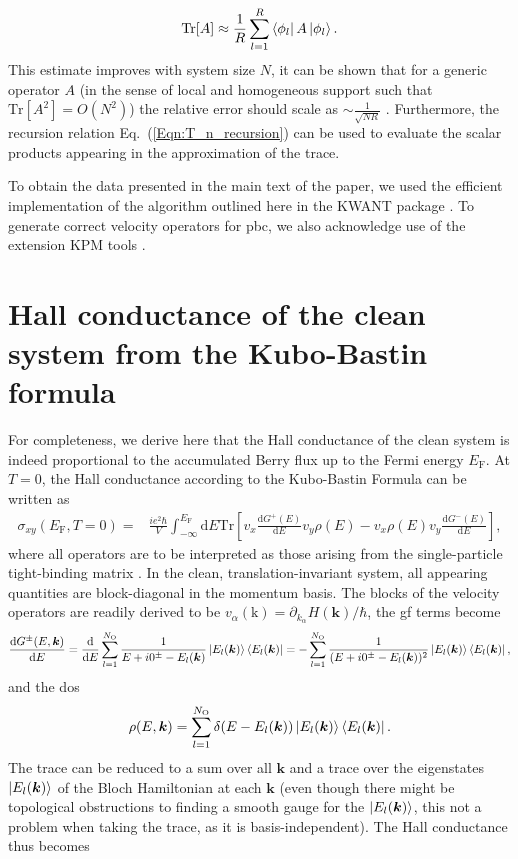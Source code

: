 \documentclass[aps,prb,amsmath,amssymb,twocolumn, superscriptaddress]{revtex4-2}
\newcommand{\eq}[1]{Eq.~(\ref{#1})}
\begin{document}
\begin{align}
\mathrm{Tr} [A] \approx \frac{1}{R} \sum_{l = 1}^R \bra{\phi_l} A \ket{\phi_l}.
\end{align}
This estimate improves with system size $N$, it can be shown that for a generic operator $A$ (in the sense of local and homogeneous support such that $\mathrm{Tr}[A^2] = O(N^2)$) the relative error should scale as $\sim \frac{1}{\sqrt{N R}}$  \cite{KPM_Review_App}. Furthermore, the recursion relation \eq{Eqn:T_n_recursion} can be used to evaluate the scalar products appearing in the approximation of the trace.

To obtain the data presented in the main text of the paper, we used the efficient implementation of the algorithm outlined here in the KWANT package \cite{Kwant_App, Kwant_Mumps_App}. To generate correct velocity operators for \gls{pbc}, we also acknowledge use of the extension KPM tools \cite{KPM_tools_App}.



\section{Hall conductance of the clean system from the Kubo-Bastin formula}
For completeness, we derive here that the Hall conductance of the clean system is indeed proportional to the accumulated Berry flux up to the Fermi energy $E_\mathrm{F}$. At $T = 0$, the Hall conductance according to the Kubo-Bastin Formula can be written as
\begin{align}
\sigma_{xy}(E_\mathrm{F}, T = 0) =& \frac{i e^2 \hbar}{V} \int_{- \infty}^{E_\mathrm{F}} \mathrm{d} E \mathrm{Tr} \left[v_x \frac{\mathrm{d} G^+(E)}{\mathrm{d} E} v_y \rho(E) - v_x \rho(E) v_y  \frac{\mathrm{d} G^-(E)}{\mathrm{d} E}  \right],
\end{align}
where all operators are to be interpreted as those arising from the single-particle tight-binding matrix \cite{Kubo_paper_App, Kubo_Bastin_App, Kubo_Bastin_modern_App}. In the clean, translation-invariant system, all appearing quantities are block-diagonal in the momentum basis. The blocks of the velocity operators are readily derived to be $v_\alpha(\mathrm k) = \partial_{k_\alpha} H(\bm k) / \hbar$,
the \gls{gf} terms become
\begin{align}
\frac{\mathrm{d} G^\pm(E, \bm k)}{\mathrm{d} E} = \frac{\mathrm{d} }{\mathrm{d} E} \sum_{l = 1}^{N_\mathrm{O}} \frac{1}{E + i 0^\pm - E_l(\bm k)} \ket{E_l(\bm k)} \bra{E_l(\bm k)} = - \sum_{l = 1}^{N_\mathrm{O}} \frac{1}{(E + i 0^\pm - E_l(\bm k))^2} \ket{E_l(\bm k)} \bra{E_l(\bm k)}, 
\end{align}
and the \gls{dos} 
\begin{align}
\rho(E, \bm k) = \sum_{l = 1}^{N_\mathrm{O}} \delta(E - E_l(\bm k)) \ket{E_l(\bm k)} \bra{E_l(\bm k)}.
\end{align}
The trace can be reduced to a sum over all $\bm k$ and a trace over the eigenstates $\ket{E_l(\bm k)}$ of the Bloch Hamiltonian at each $\bm k$ (even though there might be topological obstructions to finding a smooth gauge for the $\ket{E_l(\bm k)}$, this not a problem when taking the trace, as it is basis-independent). The Hall conductance thus becomes
 
\end{document}

